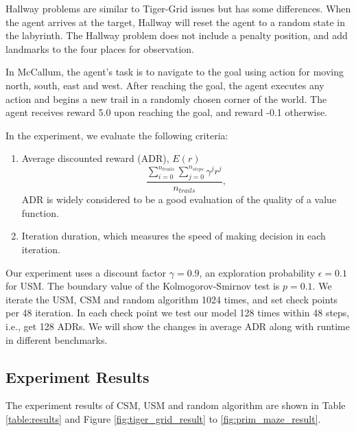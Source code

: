 \documentclass{article}
\begin{document}
Hallway problems are similar to Tiger-Grid issues but has some differences. When the agent
arrives at the target, Hallway will reset the agent to a random state in the labyrinth.
The Hallway problem does not include a penalty position, and add landmarks to the four places
for observation.

In McCallum, the agent’s task is to navigate to the goal using action for moving north,
south, east and west. After reaching the goal, the agent executes any action and begins a new
trail in a randomly chosen corner of the world. The agent receives reward 5.0 upon reaching
the goal, and reward -0.1 otherwise.

In the experiment, we evaluate the following criteria:

\begin{enumerate}
  \item Average discounted reward (ADR), $E(r)$
  \begin{equation}
    \frac{\sum_{i=0}^{n_{trails}} \sum_{j=0}^{n_{steps}} \gamma^j r^j}{n_{trails}},
  \end{equation}
  ADR is widely considered to be a good evaluation of the quality of a value function.
  
  \item Iteration duration, which measures the speed of making decision in each iteration.
\end{enumerate}

Our experiment uses a discount factor $\gamma=0.9$, an exploration probability $\epsilon=0.1$ for USM.
The boundary value of the Kolmogorov-Smirnov test is $p=0.1$. We iterate the USM, CSM and random algorithm
1024 times, and set check points per 48 iteration. In each check point we test our model 128 times
within 48 steps, i.e., get 128 ADRs. We will show the changes in average ADR along with runtime in
different benchmarks.

\subsection{Experiment Results}

The experiment results of CSM, USM and random algorithm are shown in  Table \ref{table:results} and Figure  \ref{fig:tiger_grid_result} to \ref{fig:prim_maze_result}.
\end{document}
